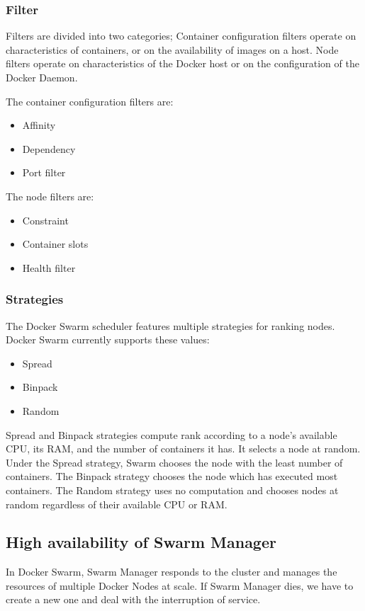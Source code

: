 \subsubsection{Filter}
Filters are divided into two categories;
Container configuration filters operate on characteristics of containers, or on the availability of images on a host.
Node filters operate on characteristics of the Docker host or on the configuration of the Docker Daemon.

The container configuration filters are:
\begin{itemize}
    \item Affinity
    \item Dependency
    \item Port filter
\end{itemize}
The node filters are:
\begin{itemize}
    \item Constraint
    \item Container slots
    \item Health filter
\end{itemize}

\subsubsection{Strategies}
The Docker Swarm scheduler features multiple strategies for ranking nodes. Docker Swarm currently supports these values:
\begin{itemize}
    \item Spread
    \item Binpack
    \item Random
\end{itemize}
Spread and Binpack strategies compute rank according to a node’s available CPU, its RAM, and the number of containers it has. It selects a node at random.
Under the Spread strategy, Swarm chooses the node with the least number of containers.
The Binpack strategy chooses the node which has executed most containers.
The Random strategy uses no computation and chooses nodes at random regardless of their available CPU or RAM.

\subsection{High availability of Swarm Manager}
In Docker Swarm, Swarm Manager responds to the cluster and manages the resources of multiple Docker Nodes at scale. If Swarm Manager dies, we have to create a new one and deal with the interruption of service.

